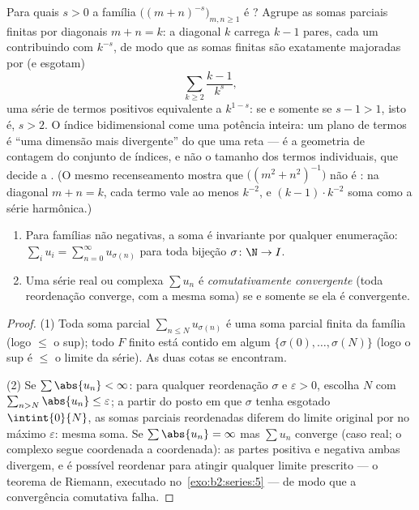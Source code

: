 \begin{example}\label{ex:b2:series:diagonalcount}
Para quais $s > 0$ a família
$\bigl((m + n)^{-s}\bigr)_{m, n \geq 1}$ é ? Agrupe as
somas parciais finitas por diagonais $m + n = k$: a diagonal $k$
carrega $k - 1$ pares, cada um contribuindo com $k^{-s}$, de modo que as
somas finitas são exatamente majoradas por (e esgotam)
\[
\sum_{k \geq 2} \frac{k - 1}{k^{s}} ,
\]
uma série de termos positivos equivalente a $k^{1-s}$: 
se e somente se $s - 1 > 1$, isto é, $s > 2$. O índice bidimensional come
uma potência inteira: um plano de termos é ``uma dimensão mais
divergente'' do que uma reta --- é a geometria de contagem do conjunto
de índices, e não o tamanho dos termos individuais, que decide a .
(O mesmo recenseamento mostra que $\bigl((m^2 + n^2)^{-1}\bigr)$ não é
: na diagonal $m + n = k$, cada termo vale ao menos
$k^{-2}$, e $(k-1)\cdot k^{-2}$ soma como a série
harmônica.)
\end{example}

\begin{theorem}\label{thm:b2:series:rearrangement}
\begin{enumerate}
  \item Para famílias não negativas, a soma é invariante por qualquer
        enumeração: $\sum_{i} u_i = \sum_{n=0}^{\infty}
        u_{\sigma(n)}$ para toda bijeção $\sigma \colon \N \to I$.
  \item Uma série real ou complexa $\sum u_n$ é \emph{comutativamente
        convergente} (toda reordenação converge, com a mesma
        soma) se e somente se ela é  convergente.
\end{enumerate}
\end{theorem}

\begin{proof}
(1) Toda soma parcial $\sum_{n \leq N} u_{\sigma(n)}$ é uma soma parcial
finita da família (logo $\leq$ o sup); todo $F$ finito está
contido em algum $\{\sigma(0), \dots, \sigma(N)\}$ (logo o sup é
$\leq$ o limite da série). As duas cotas se encontram.

(2) Se $\sum\abs{u_n} < \infty$: para qualquer reordenação $\sigma$ e
$\varepsilon > 0$, escolha $N$ com $\sum_{n > N}\abs{u_n} \leq
\varepsilon$; a partir do posto em que $\sigma$ tenha esgotado
$\intint{0}{N}$, as somas parciais reordenadas diferem do
limite original por no máximo $\varepsilon$: mesma soma. Se $\sum
\abs{u_n} = \infty$ mas $\sum u_n$ converge (caso real; o complexo
segue coordenada a coordenada): as partes positiva e negativa ambas
divergem, e é possível reordenar para atingir qualquer limite prescrito
--- o teorema de Riemann, executado no~\cref{exo:b2:series:5} ---
de modo que a convergência comutativa falha.
\end{proof}

